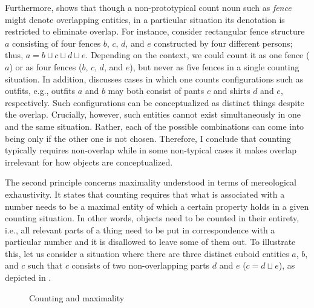 Furthermore, \citet{rothstein2010counting} shows that though a non-prototypical count noun such as \textit{fence} might denote overlapping entities, in a particular situation its denotation is restricted to eliminate overlap. For instance, consider rectangular fence structure $a$ consisting of four fences $b$, $c$, $d$, and $e$ constructed by four different persons; thus, $a = b\sqcup c\sqcup d\sqcup e$. Depending on the context, we could count it as one fence ($a$) or as four fences ($b$, $c$, $d$, and $e$), but never as five fences in a single counting situation. In addition, \citet{krifka2009counting} discusses cases in which one counts configurations such as outfits, e.g., outfits $a$ and $b$ may both consist of pants $c$ and shirts $d$ and $e$, respectively. Such configurations can be conceptualized as distinct things despite the overlap. Crucially, however, such entities cannot exist simultaneously in one and the same situation. Rather, each of the possible combinations can come into being only if the other one is not chosen. Therefore, I conclude that counting typically requires non-overlap while in some non-typical cases it makes overlap irrelevant for how objects are conceptualized. 

The second principle concerns maximality understood in terms of mereological exhaustivity. It states that counting requires that what is associated with a number needs to be a maximal entity of which a certain property holds in a given counting situation. In other words, objects need to be counted in their entirety, i.e., all relevant parts of a thing need to be put in correspondence with a particular number and it is disallowed to leave some of them out. To illustrate this, let us consider a situation where there are three distinct cuboid entities $a$, $b$, and $c$ such that $c$ consists of two non-overlapping parts $d$ and $e$ ($c = d\sqcup e$), as depicted in . 

\begin{figure}[h!]
\centering
{}
\caption{Counting and maximality}
\label{fig:counting-and-maximality}
\end{figure}

